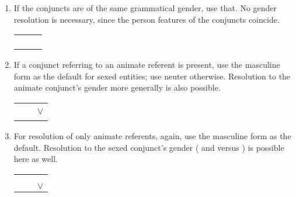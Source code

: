 \begin{enumerate}
\item If the conjuncts are of the same grammatical gender, use that. No
gender resolution is necessary, since the person features of the conjuncts
coincide.

	\quad%
	\begin{tabular}[t]{@{} c @{ $\cup$ } c @{ $\implies$ } c}
	\M{} & \M{} & \M{} \\
	\F{} & \F{} & \F{} \\
	\N{} & \N{} & \N{} \\
	\Inan{} & \Inan{} & \Inan{} \\
	\end{tabular}

\item If a conjunct referring to an animate referent is present, use the
masculine form as the default for sexed entities; use neuter otherwise.
Resolution to the animate conjunct's gender more generally is also possible.

	\quad%
	\begin{tabular}[t]{@{} c @{ $\cup$ } c @{ $\implies$ } c}
	\M{} & \Inan{} & \M{} \\
	\F{} & \Inan{} & \M{} $\lor$ \F{} \\
	\N{} & \Inan{} & \N{} \\
	\end{tabular}

\item For resolution of only animate referents, again, use the masculine form
as the default. Resolution to the sexed conjunct's gender (\M{} and \F{} versus
\N{}) is possible here as well.

	\quad%
	\begin{tabular}[t]{@{} c @{ $\cup$ } c @{ $\implies$ } c}
	\M{} & \F{} & \M{} \\
	\M{} & \N{} & \M{} \\
	\F{} & \N{} & \M{} $\lor$ \F{} \\
	\end{tabular}

\end{enumerate}

